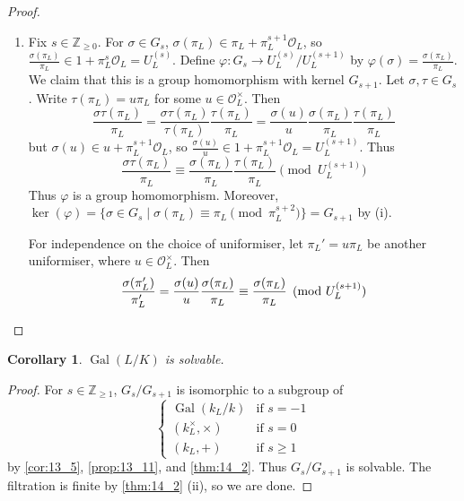 \documentclass[11pt]{article}
\theoremstyle{definition}
\theoremstyle{plain}
\newtheorem{corollary}[definition]{Corollary}
\theoremstyle{remark}
\DeclareMathOperator{\Gal}{Gal}
\newcommand{\ZZ}{\mathbb{Z}}
\newcommand{\cO}{\mathcal{O}}
\begin{document}
\begin{proof}
\begin{enumerate}
        \item Fix $s \in \ZZ_{\ge 0}$. For $\sigma \in G_s$, $\sigma(\pi_L) \in \pi_L + \pi_L^{s+1} \cO_L$, so $\frac{\sigma(\pi_L)}{\pi_L} \in 1 + \pi_L^s \cO_L = U_L^{(s)}$. Define $\varphi : G_s \to U_L^{(s)} / U_L^{(s+1)}$ by $\varphi(\sigma) = \frac{\sigma(\pi_L)}{\pi_L}$. We claim that this is a group homomorphism with kernel $G_{s+1}$. Let $\sigma, \tau \in G_s$. Write $\tau(\pi_L) = u \pi_L$ for some $u \in \cO_L^\times$. Then
            \begin{equation*}
                \frac{\sigma\tau(\pi_L)}{\pi_L} = \frac{\sigma\tau(\pi_L)}{\tau(\pi_L)} \frac{\tau(\pi_L)}{\pi_L} = \frac{\sigma(u)}{u} \frac{\sigma(\pi_L)}{\pi_L} \frac{\tau(\pi_L)}{\pi_L}
            \end{equation*}
            but $\sigma(u) \in u + \pi_L^{s+1} \cO_L$, so $\frac{\sigma(u)}{u} \in 1 + \pi_L^{s+1} \cO_L = U_L^{(s+1)}$. Thus
            \begin{equation*}
                \frac{\sigma\tau(\pi_L)}{\pi_L} \equiv \frac{\sigma(\pi_L)}{\pi_L} \frac{\tau(\pi_L)}{\pi_L} \pmod{U_L^{(s+1)}}
            \end{equation*}
            Thus $\varphi$ is a group homomorphism. Moreover, $\ker(\varphi) = \{\sigma \in G_s \mid \sigma(\pi_L) \equiv \pi_L \pmod{\pi_L^{s+2}}\} = G_{s+1}$ by (i).

            For independence on the choice of uniformiser, let $\pi_L' = u \pi_L$ be another uniformiser, where $u \in \cO_L^\times$. Then
            \begin{equation*}
                \frac{\sigma(\pi_L')}{\pi_L'} = \frac{\sigma(u)}{u} \frac{\sigma(\pi_L)}{\pi_L} \equiv \frac{\sigma(\pi_L)}{\pi_L} \pmod{U_L^{(s+1)}}
                \qedhere
            \end{equation*}
    \end{enumerate}
\end{proof}

\begin{corollary}\label{cor:14_3}
    $\Gal(L/K)$ is solvable.
\end{corollary}
\begin{proof}
    For $s \in \ZZ_{\ge 1}$, $G_s / G_{s+1}$ is isomorphic to a subgroup of
    \begin{equation*}
        \begin{cases}
            \Gal(k_L/k) & \text{if } s = -1\\
            (k_L^\times, \times) & \text{if } s = 0\\
            (k_L, +) & \text{if } s \ge 1
        \end{cases}
    \end{equation*}
    by \autoref{cor:13_5}, \autoref{prop:13_11}, and \autoref{thm:14_2}. Thus $G_s / G_{s+1}$ is solvable. The filtration is finite by \autoref{thm:14_2} (ii), so we are done.
\end{proof}
\end{document}
